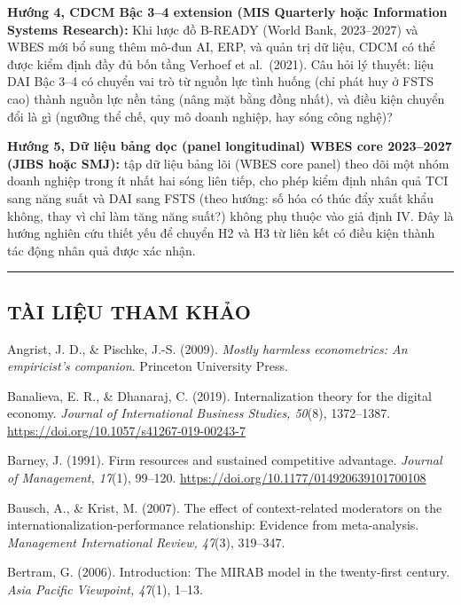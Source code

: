\documentclass[
  a4paper,
  13pt]{extreport}
\begin{document}
\textbf{Hướng 4, CDCM Bậc 3--4 extension (MIS Quarterly hoặc Information
Systems Research):} Khi lược đồ B-READY (World Bank, 2023--2027) và WBES
mới bổ sung thêm mô-đun AI, ERP, và quản trị dữ liệu, CDCM có thể được
kiểm định đầy đủ bốn tầng Verhoef et al.~(2021). Câu hỏi lý thuyết: liệu
DAI Bậc 3--4 có chuyển vai trò từ nguồn lực tình huống (chỉ phát huy ở
FSTS cao) thành nguồn lực nền tảng (nâng mặt bằng đồng nhất), và điều
kiện chuyển đổi là gì (ngưỡng thể chế, quy mô doanh nghiệp, hay sóng
công nghệ)?

\textbf{Hướng 5, Dữ liệu bảng dọc (panel longitudinal) WBES core
2023--2027 (JIBS hoặc SMJ):} tập dữ liệu bảng lõi (WBES core panel) theo
dõi một nhóm doanh nghiệp trong ít nhất hai sóng liên tiếp, cho phép
kiểm định nhân quả TCI sang năng suất và DAI sang FSTS (theo hướng: số
hóa có thúc đẩy xuất khẩu không, thay vì chỉ làm tăng năng suất?) không
phụ thuộc vào giả định IV. Đây là hướng nghiên cứu thiết yếu để chuyển
H2 và H3 từ liên kết có điều kiện thành tác động nhân quả được xác nhận.

\begin{center}\rule{0.5\linewidth}{0.5pt}\end{center}

\hypertarget{tuxe0i-liux1ec7u-tham-khux1ea3o}{%
\subsection{TÀI LIỆU THAM KHẢO}\label{tuxe0i-liux1ec7u-tham-khux1ea3o}}

Angrist, J. D., \& Pischke, J.-S. (2009). \emph{Mostly harmless
econometrics: An empiricist's companion}. Princeton University Press.

Banalieva, E. R., \& Dhanaraj, C. (2019). Internalization theory for the
digital economy. \emph{Journal of International Business Studies,
50}(8), 1372--1387. \url{https://doi.org/10.1057/s41267-019-00243-7}

Barney, J. (1991). Firm resources and sustained competitive advantage.
\emph{Journal of Management, 17}(1), 99--120.
\url{https://doi.org/10.1177/014920639101700108}

Bausch, A., \& Krist, M. (2007). The effect of context-related
moderators on the internationalization-performance relationship:
Evidence from meta-analysis. \emph{Management International Review,
47}(3), 319--347.

Bertram, G. (2006). Introduction: The MIRAB model in the twenty-first
century. \emph{Asia Pacific Viewpoint, 47}(1), 1--13.
\end{document}
